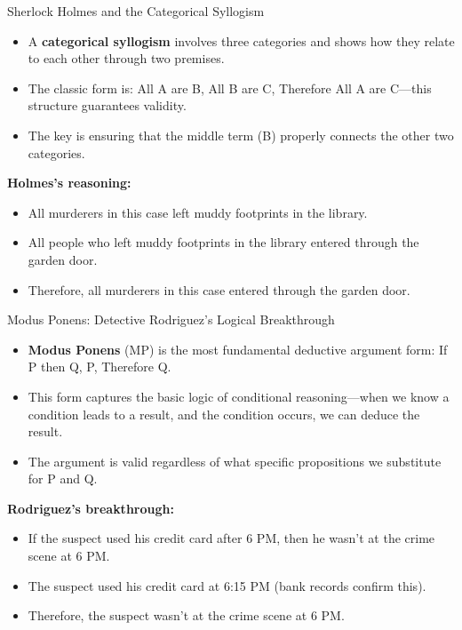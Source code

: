 \documentclass{beamer}
\begin{document}
	\begin{frame}{Sherlock Holmes and the Categorical Syllogism}
		\begin{itemize}
			\item A \textbf{categorical syllogism} involves three categories and shows how they relate to each other through two premises.
			\item The classic form is: All A are B, All B are C, Therefore All A are C—this structure guarantees validity.
			\item The key is ensuring that the middle term (B) properly connects the other two categories.
		\end{itemize}
		
		\begin{example}
			\textbf{Holmes's reasoning:}
			\begin{itemize}
				\item All murderers in this case left muddy footprints in the library.
				\item All people who left muddy footprints in the library entered through the garden door.
				\item Therefore, all murderers in this case entered through the garden door.
			\end{itemize}
		\end{example}
	\end{frame}
	
	\begin{frame}{Modus Ponens: Detective Rodriguez's Logical Breakthrough}
		\begin{itemize}
			\item \textbf{Modus Ponens} (MP) is the most fundamental deductive argument form: If P then Q, P, Therefore Q.
			\item This form captures the basic logic of conditional reasoning—when we know a condition leads to a result, and the condition occurs, we can deduce the result.
			\item The argument is valid regardless of what specific propositions we substitute for P and Q.
		\end{itemize}
		
		\begin{example}
			\scriptsize
			\textbf{Rodriguez's breakthrough:}
			\begin{itemize}
				\item If the suspect used his credit card after 6 PM, then he wasn't at the crime scene at 6 PM.
				\item The suspect used his credit card at 6:15 PM (bank records confirm this).
				\item Therefore, the suspect wasn't at the crime scene at 6 PM.
			\end{itemize}
		\end{example}
	\end{frame}
	
\end{document}

